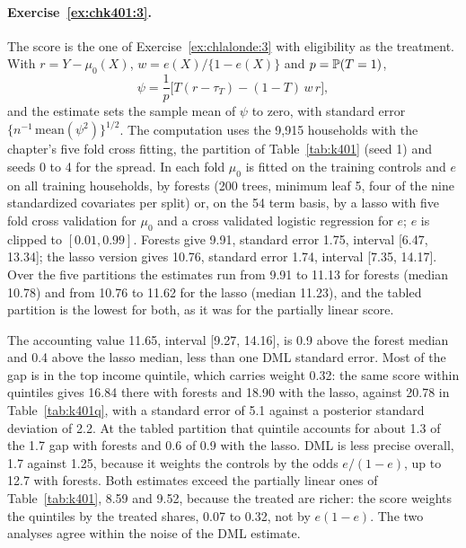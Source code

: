 \paragraph{Exercise~\ref{ex:chk401:3}.} The score is the one of Exercise~\ref{ex:chlalonde:3} with eligibility as the treatment. With $r = Y - \mu_0(X)$, $w = e(X)/\{1 - e(X)\}$ and $p = \mathbb{P}(T = 1)$,
\[
\psi = \frac1p\bigl[T(r - \tau_T) - (1 - T)\,w\,r\bigr],
\]
and the estimate sets the sample mean of $\psi$ to zero, with standard error $\{n^{-1}\,\mathrm{mean}(\psi^2)\}^{1/2}$. The computation uses the 9,915 households with the chapter's five fold cross fitting, the partition of Table~\ref{tab:k401} (seed 1) and seeds 0 to 4 for the spread. In each fold $\mu_0$ is fitted on the training controls and $e$ on all training households, by forests (200 trees, minimum leaf 5, four of the nine standardized covariates per split) or, on the 54 term basis, by a lasso with five fold cross validation for $\mu_0$ and a cross validated logistic regression for $e$; $e$ is clipped to $[0.01, 0.99]$. Forests give 9.91, standard error 1.75, interval [6.47, 13.34]; the lasso version gives 10.76, standard error 1.74, interval [7.35, 14.17]. Over the five partitions the estimates run from 9.91 to 11.13 for forests (median 10.78) and from 10.76 to 11.62 for the lasso (median 11.23), and the tabled partition is the lowest for both, as it was for the partially linear score.

The accounting value 11.65, interval [9.27, 14.16], is 0.9 above the forest median and 0.4 above the lasso median, less than one DML standard error. Most of the gap is in the top income quintile, which carries weight 0.32: the same score within quintiles gives 16.84 there with forests and 18.90 with the lasso, against 20.78 in Table~\ref{tab:k401q}, with a standard error of 5.1 against a posterior standard deviation of 2.2. At the tabled partition that quintile accounts for about 1.3 of the 1.7 gap with forests and 0.6 of 0.9 with the lasso. DML is less precise overall, 1.7 against 1.25, because it weights the controls by the odds $e/(1 - e)$, up to 12.7 with forests. Both estimates exceed the partially linear ones of Table~\ref{tab:k401}, 8.59 and 9.52, because the treated are richer: the score weights the quintiles by the treated shares, 0.07 to 0.32, not by $e(1 - e)$. The two analyses agree within the noise of the DML estimate.

